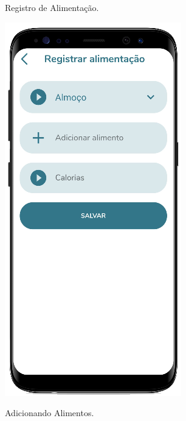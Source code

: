 \begin{figure}[htb]
    \centering
    \begin{minipage}{0.39\textwidth}
        \centering
        \caption{Registro de Alimentação.}\label{fig_reg_alimentacao}
        \includegraphics[scale=0.60]{Imagens/desenvolvimento/app/reg_alimentacao.png}
    \end{minipage}
    \hfill
    \begin{minipage}{0.58\textwidth}
        \centering
        \caption{Adicionando Alimentos.}\label{fig_reg_alimentacao_2}

\end{minipage}
\end{figure}
